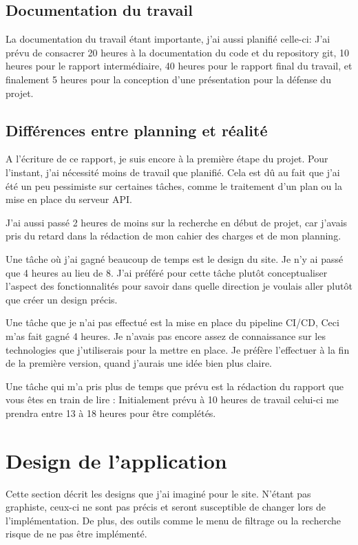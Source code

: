 \documentclass[
    iai, %
    il, %
]{heig-tb}
\begin{document}
\section{Documentation du travail}
La documentation du travail étant importante, j'ai aussi planifié celle-ci:
J'ai prévu de consacrer 20 heures à la documentation du code et du repository git,
10 heures pour le rapport intermédiaire,
40 heures pour le rapport final du travail,
et finalement 5 heures pour la conception d'une présentation pour la défense du projet.

\section{Différences entre planning et réalité}
A l'écriture de ce rapport, je suis encore à la première étape du projet.
Pour l'instant, j'ai nécessité moins de travail que planifié.
Cela est dû au fait que j'ai été un peu pessimiste sur certaines tâches,
comme le traitement d'un plan ou la mise en place du serveur API.

J'ai aussi passé 2 heures de moins sur la recherche en début de projet,
car j'avais pris du retard dans la rédaction de mon cahier des charges et de mon planning.

Une tâche où j'ai gagné beaucoup de temps est le design du site. Je n'y ai passé que 4 heures au lieu de 8.
J'ai préféré pour cette tâche plutôt conceptualiser l'aspect des fonctionnalités
pour savoir dans quelle direction je voulais aller plutôt que créer un design précis.

Une tâche que je n'ai pas effectué est la mise en place du pipeline CI/CD, Ceci m'as fait gagné 4 heures.
Je n'avais pas encore assez de connaissance sur les technologies que j'utiliserais pour la mettre en place.
Je préfère l'effectuer à la fin de la première version, quand j'aurais une idée bien plus claire.

Une tâche qui m'a pris plus de temps que prévu est la rédaction du rapport que vous êtes en train de lire :
Initialement prévu à 10 heures de travail celui-ci me prendra entre 13 à 18 heures pour être complétés.

\chapter{Design de l'application}
Cette section décrit les designs que j'ai imaginé pour le site.
N'étant pas graphiste, ceux-ci ne sont pas précis et seront susceptible de changer lors de l'implémentation.
De plus, des outils comme le menu de filtrage ou la recherche risque de ne pas être implémenté.
\end{document}
